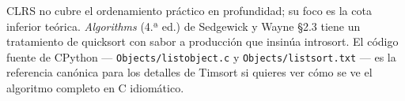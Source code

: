 \documentclass[11pt,a4paper]{article}
\begin{document}
CLRS no cubre el ordenamiento práctico en profundidad; su foco es la cota inferior teórica. \emph{Algorithms} (4.ª ed.) de Sedgewick y Wayne \S 2.3 tiene un tratamiento de quicksort con sabor a producción que insinúa introsort. El código fuente de CPython --- \texttt{Objects/listobject.c} y \texttt{Objects/listsort.txt} --- es la referencia canónica para los detalles de Timsort si quieres ver cómo se ve el algoritmo completo en C idiomático.
\end{document}
